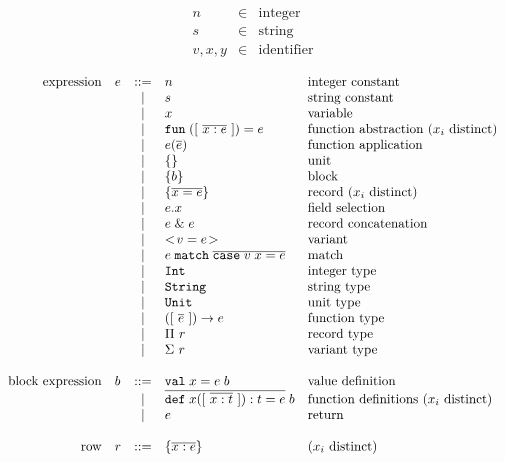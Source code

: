 \documentclass[11pt]{article}
\begin{document}
\[
\begin{array}{lcl}
n       & \in & \text{integer} \\
s       & \in & \text{string} \\
v, x, y & \in & \text{identifier} \\
\end{array}
\]
\[
\begin{array}{rlcll}
\text{expression}
  & e & ::= & n                         & \text{integer constant} \\
  &   & |   & s                         & \text{string constant} \\
  &   & |   & x                         & \text{variable} \\
  &   & |   & \mathtt{fun}\;([\ \overline{x : e}\ ]) = e     & \text{function abstraction ($x_i$ distinct)} \\
  &   & |   & e(\overline{e})               & \text{function application} \\
  &   & |   & \{ \}{}                          & \text{unit} \\
  &   & |   & \{ b \}                         & \text{block} \\
  &   & |   & \{ \overline{x = e} \}                      & \text{record ($x_i$ distinct)} \\
  &   & |   & e . x                      & \text{field selection} \\
  &   & |   & e\;\&\;e                      & \text{record concatenation} \\
  &   & |   & <\!v = e\!>                      & \text{variant} \\
  &   & |   & e\;\mathtt{match}\;\overline{\mathtt{case}\;v\;x = e}  & \text{match} \\
  &   & |   & \mathtt{Int}                           & \text{integer type} \\
  &   & |   & \mathtt{String}                           & \text{string type} \\
  &   & |   & \mathtt{Unit}                           & \text{unit type} \\
  &   & |   & ([\ \overline{e}\ ]) -> e              & \text{function type} \\
  &   & |   & \Pi\ r                        & \text{record type} \\
  &   & |   & \Sigma\ r                        & \text{variant type} \\
\\
\text{block expression}
  & b & ::= & \mathtt{val}\;x = e\;b                 & \text{value definition} \\
  &   & |   & \overline{\mathtt{def}\;x([\ \overline{x : t}\ ]) : t = e}\;b   & \text{function definitions ($x_i$ distinct)} \\
  &   & |   & e                       & \text{return} \\
\\
\text{row}
  & r & ::= & \{ \overline{x : e} \}       & \text{($x_i$ distinct)}
\end{array}
\]
\end{document}
